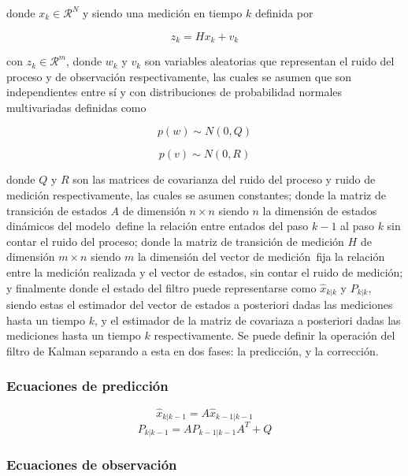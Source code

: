 donde $x_k \in \mathcal{R}^{N}$ y siendo una medición en tiempo $k$ definida por

\begin{equation}
z_k = Hx_k + v_k
\end{equation}

con $z_k \in \mathcal{R}^m$, donde $w_k$ y $v_k$ son variables aleatorias que representan el ruido del proceso y de observación respectivamente, las cuales se asumen que son independientes entre sí y con distribuciones de probabilidad normales multivariadas definidas como

\[ p(w) \sim N(0, Q) \]

\[ p(v) \sim N(0, R) \]

donde $Q$ y $R$ son las matrices de covarianza del ruido del proceso y ruido de medición respectivamente, las cuales se asumen constantes; donde la matriz de transición de estados $A$ de dimensión $n\times n$ \textemdash siendo $n$ la dimensión de estados dinámicos del modelo\textemdash \ define la relación entre entados del paso $k-1$ al paso $k$ sin contar el ruido del proceso; donde la matriz de transición de medición $H$ de dimensión $m\times n$ \textemdash siendo $m$ la dimensión del vector de medición\textemdash \  fija la relación entre la medición realizada y el vector de estados, sin contar el ruido de medición; y finalmente donde el estado del filtro puede representarse como $\hat{x}_{k|k}$ y $P_{k|k}$, siendo estas el estimador del vector de estados a posteriori dadas las mediciones hasta un tiempo $k$, y el estimador de la matriz de covariaza a posteriori dadas las mediciones hasta un tiempo $k$ respectivamente. Se puede definir la operación del filtro de Kalman separando a esta en dos fases: la predicción, y la corrección.

\subsubsection{Ecuaciones de predicción}

\begin{equation}
\hat{x}_{k|k-1} = A\hat{x}_{k-1|k-1}
\end{equation}
\begin{equation}
P_{k|k-1} = AP_{k-1|k-1}A^T + Q
\end{equation}

\subsubsection{Ecuaciones de observación}

